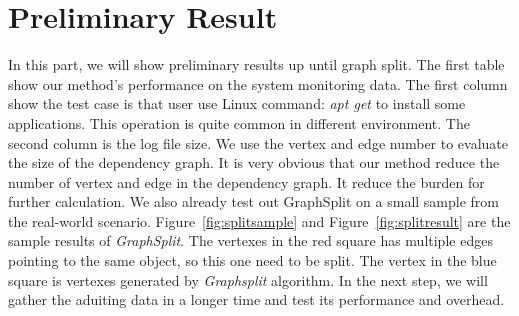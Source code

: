 

\section{Preliminary Result}

In this part, we will show preliminary results up until graph split. The first table show our method's performance on the system monitoring data. The first column show the test case is that user use Linux command: \textit{apt get} to install some applications. This operation is quite common in different environment. The second column is the log file size. We use the vertex and edge number to evaluate the size of the dependency graph. It is very obvious that our method reduce the number of vertex and edge in the dependency graph.  It reduce the burden for further calculation. We also already test out GraphSplit on a small sample from the real-world scenario. Figure~\ref{fig:splitsample} and Figure~\ref{fig:splitresult} are the sample results of \emph{GraphSplit}. The vertexes in the red square has multiple edges pointing to the same object, so this one need to be split. The vertex in the blue square is vertexes generated by \emph{Graphsplit} algorithm. In the next step, we will gather the aduiting data in a longer time and test its performance and overhead. 


